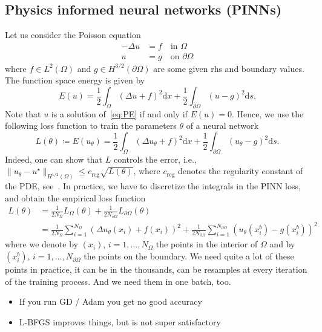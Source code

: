 \subsection{Physics informed neural networks (PINNs)}
Let us consider the Poisson equation %
\begin{align*}\tag{PE}\label{eq:PE}
  -\Delta u & = f \quad \text{in }\Omega \\
  u & = g \quad \text{on }\partial\Omega
\end{align*}
where $f\in L^2(\Omega)$ and $g\in H^{3/2}(\partial\Omega)$ are some given rhs and boundary values.
The function space energy is given by
\[ E(u) = \frac{1}{2} \int_\Omega (\Delta u + f)^2 \mathrm dx + \frac12 \int_{\partial\Omega} (u-g)^2 \mathrm ds. \]
Note that $u$ is a solution of~\eqref{eq:PE} if and only if $E(u)=0$. Hence, we use the following loss function to train the parameters $\theta$ of a neural network
\[ L(\theta) \coloneqq E(u_\theta) = \frac{1}{2} \int_\Omega (\Delta u_\theta + f)^2 \mathrm dx + \frac12 \int_{\partial\Omega} (u_\theta-g)^2 \mathrm ds. \]
Indeed, one can show that $L$ controls the error, i.e., $\lVert u_\theta - u^\star \rVert_{H^{1/2}(\Omega)} \le c_{\operatorname{reg}} \sqrt{L(\theta)}$, where $c_{\operatorname{reg}}$ denotes the regularity constant of the PDE, see~\cite{?}.
In practice, we have to discretize the integrals in the PINN loss, and obtain the empirical loss function %
\begin{align*}
  L(\theta)
  &=
    \frac{1}{2N_\Omega} L_\Omega(\theta) + \frac{1}{2N_{\partial\Omega}}L_{\partial\Omega}(\theta)
  \\
  &=
    \frac{1}{2N_\Omega} \sum_{i=1}^{N_\Omega} (\Delta u_\theta(x_i) + f(x_i))^2 + \frac{1}{2N_{\partial\Omega}}\sum_{i=1}^{N_{\partial\Omega}} ( u_\theta(x^b_i) - g(x^b_i))^2
\end{align*}
where we denote by $(x_i)$, $i=1,\dots,N_\Omega$ the points in the interior of $\Omega$ and by $(x^b_i)$, $i=1,\dots,N_{\partial\Omega}$ the points on the boundary.
We need quite a lot of these points in practice, it can be in the thousands, can be resamples at every iteration of the training process.
And we need them in one batch, too.

\begin{itemize}
    \item If you run GD / Adam you get no good accuracy~\cite{?}
    \item L-BFGS improves things, but is not super satisfactory
\end{itemize}

